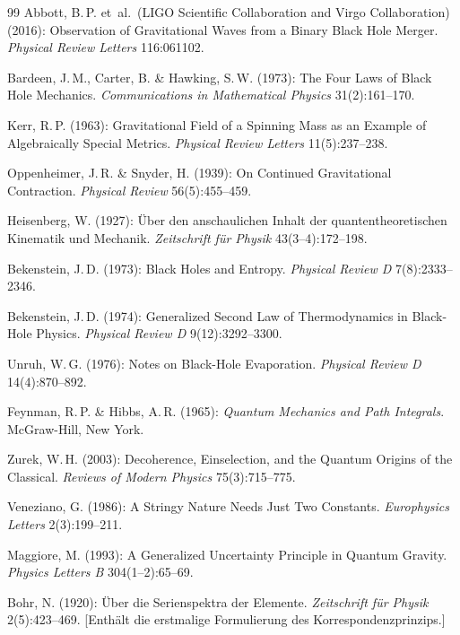 ﻿\documentclass[12pt,a4paper]{report}
\begin{document}
\begin{thebibliography}{99}
Abbott, B.\,P. et\ al.\ (LIGO Scientific Collaboration and Virgo Collaboration) (2016): Observation of Gravitational Waves from a Binary Black Hole Merger. \textit{Physical Review Letters} 116:061102.

Bardeen, J.\,M., Carter, B. \& Hawking, S.\,W. (1973): The Four Laws of Black Hole Mechanics. \textit{Communications in Mathematical Physics} 31(2):161--170.

Kerr, R.\,P. (1963): Gravitational Field of a Spinning Mass as an Example of Algebraically Special Metrics. \textit{Physical Review Letters} 11(5):237--238.

Oppenheimer, J.\,R. \& Snyder, H. (1939): On Continued Gravitational Contraction. \textit{Physical Review} 56(5):455--459.


Heisenberg, W. (1927): Über den anschaulichen Inhalt der quantentheoretischen Kinematik und Mechanik. \textit{Zeitschrift für Physik} 43(3--4):172--198.

Bekenstein, J.\,D. (1973): Black Holes and Entropy. \textit{Physical Review D} 7(8):2333--2346.

Bekenstein, J.\,D. (1974): Generalized Second Law of Thermodynamics in Black-Hole Physics. \textit{Physical Review D} 9(12):3292--3300.

Unruh, W.\,G. (1976): Notes on Black-Hole Evaporation. \textit{Physical Review D} 14(4):870--892.

Feynman, R.\,P. \& Hibbs, A.\,R. (1965): \textit{Quantum Mechanics and Path Integrals}. McGraw-Hill, New York.

Zurek, W.\,H. (2003): Decoherence, Einselection, and the Quantum Origins of the Classical. \textit{Reviews of Modern Physics} 75(3):715--775.

Veneziano, G. (1986): A Stringy Nature Needs Just Two Constants. \textit{Europhysics Letters} 2(3):199--211.

Maggiore, M. (1993): A Generalized Uncertainty Principle in Quantum Gravity. \textit{Physics Letters B} 304(1--2):65--69.

Bohr, N. (1920): Über die Serienspektra der Elemente. \textit{Zeitschrift für Physik} 2(5):423--469. [Enthält die erstmalige Formulierung des Korrespondenzprinzips.]


\end{thebibliography}
\end{document}
